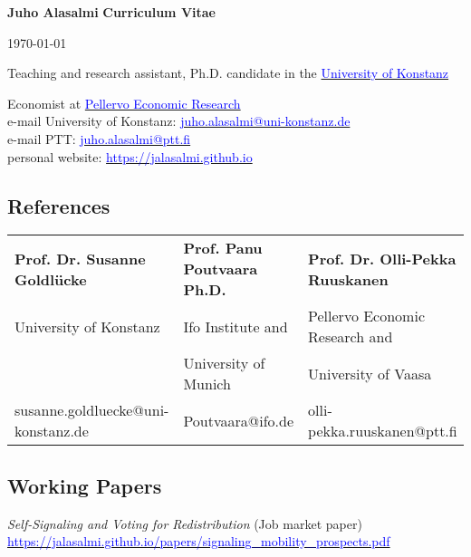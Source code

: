 \documentclass[16pt]{article}
\begin{document}
\noindent \textbf{Juho Alasalmi} \hfill{\textbf{Curriculum Vitae}} \par
\noindent  \hfill{\today} \par
\noindent Teaching and research assistant, Ph.D. candidate in the \href{https://www.wiwi.uni-konstanz.de/goldluecke/team/academic-staff/doctoral-students/}{\textcolor{blue}{University of Konstanz}} \par
\noindent Economist at \href{http://www.ptt.fi/}{\textcolor{blue}{Pellervo Economic Research}} \\

\noindent e-mail University of Konstanz: \href{mailto: juho.alasalmi@uni-konstanz.de}{\textcolor{blue}{juho.alasalmi@uni-konstanz.de}} \\
\noindent e-mail PTT: \href{mailto: juho.alasalmi@ptt.fi}{\textcolor{blue}{juho.alasalmi@ptt.fi}}\\
\noindent personal website: \href{https://jalasalmi.github.io}{\textcolor{blue}{https://jalasalmi.github.io}}

\subsection*{References}

\begin{tabular}{@{}p{2.2in}|p{2in}|p{2.3in}}
\textbf{Prof. Dr. Susanne Goldlücke}    &\textbf{Prof. Panu Poutvaara Ph.D.}   &  \textbf{Prof. Dr. Olli-Pekka Ruuskanen}  \\
University of Konstanz            &  Ifo Institute and                    & Pellervo Economic Research and \\
                                            & University of Munich                &  University of Vaasa   \\
susanne.goldluecke@uni-konstanz.de        &   Poutvaara@ifo.de   &     olli-pekka.ruuskanen@ptt.fi \\
\end{tabular}


\subsection*{Working Papers}

\noindent \textit{Self-Signaling and Voting for Redistribution} (Job market paper) \\ \href{https://jalasalmi.github.io/papers/signaling\_mobility\_prospects.pdf}{\textcolor{blue}{https://jalasalmi.github.io/papers/signaling\_mobility\_prospects.pdf}} \\
\end{document}
